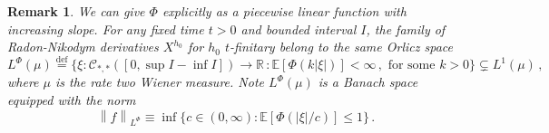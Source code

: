 \documentclass[11pt, reqno]{amsart}
\numberwithin{equation}{section}
\newtheorem*{remark}{Remark}
\newcommand{\R}{\ensuremath{\mathbb{R}}}
\newcommand{\norm}[1]{\left\lVert#1\right\rVert}
\begin{document}
\begin{remark}
    We can give $\Phi$ explicitly as a piecewise linear function with increasing slope. For any fixed time $t>0$ and bounded interval $I$, the family of Radon-Nikodym derivatives $X^{h_0}$ for $h_0$ $t$-finitary belong to the same Orlicz space
   \begin{equation*}
   L^\Phi (\mu)\stackrel{\mathrm{def}}{=} \{\xi: \mathscr{C}_{*, *}([0, \sup I - \inf I])\to \R\,: \mathbb{E}[\Phi(k|\xi|)]<\infty\,,\text{ for some } k> 0\}\subsetneq L^1(\mu)\,,
   \end{equation*}
   where $\mu$ is the rate two Wiener measure. Note $L^\Phi (\mu)$ is a Banach space equipped with the norm
   \begin{equation*}
   \norm{f}_{L^\Phi} \equiv \inf\{c\in (0, \infty): \mathbb{E}[\Phi(|\xi|/c)]\le 1\}\,.
   \end{equation*}
    
\end{remark}
\end{document}

